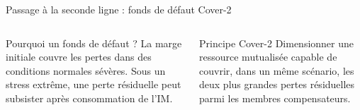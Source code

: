 \documentclass[10pt,aspectratio=169]{beamer}
\begin{document}
\begin{frame}{Passage à la seconde ligne : fonds de défaut Cover-2}
  \begin{columns}[T,onlytextwidth]
    \begin{block}{Pourquoi un fonds de défaut ?}
      La marge initiale couvre les pertes dans des conditions normales
      sévères. Sous un stress extrême, une perte résiduelle peut subsister
      après consommation de l'IM.
    \end{block}

    \begin{block}{Principe Cover-2}
      Dimensionner une ressource mutualisée capable de couvrir,
      dans un même scénario, les deux plus grandes pertes résiduelles
      parmi les membres compensateurs.
    \end{block}
  \end{columns}

  \vspace{0.45cm}
  \centering
\end{frame}
\end{document}
